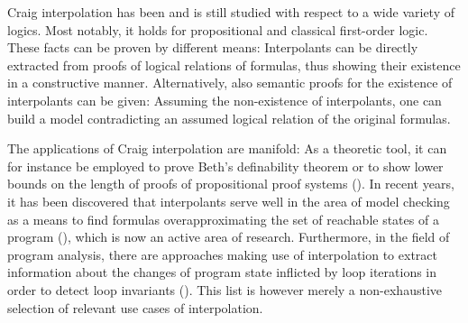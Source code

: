 Craig interpolation has been and is still studied with respect to a wide variety of logics.
Most notably, it holds for propositional and classical first-order logic.
These facts can be proven by different means:
Interpolants can be directly extracted from proofs of logical relations of formulas, thus showing their existence in a constructive manner.
Alternatively, also semantic proofs for the existence of interpolants can be given:
Assuming the non-existence of interpolants, one can build a model contradicting an assumed logical relation of the original formulas.

The applications of Craig interpolation are manifold:
As a theoretic tool, it can for instance be employed to prove Beth's definability theorem or to show lower bounds on the length of proofs of propositional proof systems (\cite{krajivcek1997interpolation,Pudlak97}).
In recent years, it has been discovered that interpolants serve well in the area of model checking as a means to find formulas overapproximating the set of reachable states of a program (\cite{McMillan03}), which is now an active area of research.
Furthermore, in the field of program analysis, there are approaches making use of interpolation to extract information about the changes of program state inflicted by loop iterations in order to detect loop invariants  (\cite{weissenbacher2010}).
This list is however merely a non-exhaustive selection of relevant use cases of interpolation.

\mytodo

